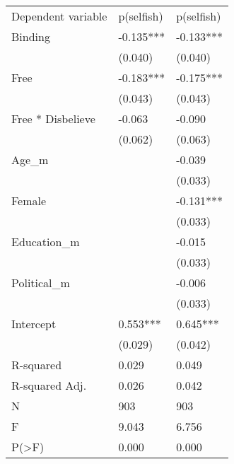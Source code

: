 \begin{tabular}{lll}
Dependent variable & p(selfish) & p(selfish) \\
Binding & -0.135*** & -0.133*** \\
 & (0.040) & (0.040) \\
Free & -0.183*** & -0.175*** \\
 & (0.043) & (0.043) \\
Free * Disbelieve & -0.063 & -0.090 \\
 & (0.062) & (0.063) \\
Age_m &  & -0.039 \\
 &  & (0.033) \\
Female &  & -0.131*** \\
 &  & (0.033) \\
Education_m &  & -0.015 \\
 &  & (0.033) \\
Political_m &  & -0.006 \\
 &  & (0.033) \\
Intercept & 0.553*** & 0.645*** \\
 & (0.029) & (0.042) \\
R-squared & 0.029 & 0.049 \\
R-squared Adj. & 0.026 & 0.042 \\
N & 903 & 903 \\
F & 9.043 & 6.756 \\
P(>F) & 0.000 & 0.000 \\
\end{tabular}
